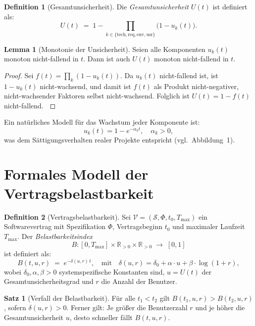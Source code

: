 ﻿\documentclass[a4paper,12pt]{article}
\theoremstyle{definition}
\newtheorem{definition}{Definition}
\newtheorem{satz}{Satz}
\newtheorem{lemma}{Lemma}
\newenvironment{beweis}{\begin{proof}}{\end{proof}}
\begin{document}
\begin{definition}[Gesamtunsicherheit]
    Die \emph{Gesamtunsicherheit} $U(t)$ ist definiert als:
    \[
        U(t) \;=\; 1 - \prod_{k \in \{\mathrm{tech, req, env, usr}\}} \bigl(1 - u_k(t)\bigr).
    \]
\end{definition}

\begin{lemma}[Monotonie der Unsicherheit]
\label{lem:monotonie}
    Seien alle Komponenten $u_k(t)$ monoton nicht-fallend in $t$. Dann ist auch $U(t)$
    monoton nicht-fallend in $t$.
\end{lemma}

\begin{beweis}
    Sei $f(t) = \prod_{k}(1 - u_k(t))$. Da $u_k(t)$ nicht-fallend ist, ist $1 - u_k(t)$
    nicht-wachsend, und damit ist $f(t)$ als Produkt nicht-negativer, nicht-wachsender
    Faktoren selbst nicht-wachsend. Folglich ist $U(t) = 1 - f(t)$ nicht-fallend.
    $\qedhere$
\end{beweis}

Ein nat\"urliches Modell f\"ur das Wachstum jeder Komponente ist:
\[
    u_k(t) = 1 - e^{-\alpha_k t}, \quad \alpha_k > 0,
\]
was dem S\"attigungsverhalten realer Projekte entspricht (vgl.\ Abbildung~1).

\section{Formales Modell der Vertragsbelastbarkeit}

\begin{definition}[Vertragsbelastbarkeit]
\label{def:belastbarkeit}
    Sei $\mathcal{V} = (\mathcal{S}, \Phi, t_0, T_{\max})$ ein Softwarevertrag mit
    Spezifikation $\Phi$, Vertragsbeginn $t_0$ und maximaler Laufzeit $T_{\max}$.
    Der \emph{Belastbarkeitsindex}
    \[
        B\colon [0, T_{\max}] \times \mathbb{R}_{>0} \times \mathbb{R}_{>0} \;\to\; [0,1]
    \]
    ist definiert als:
    \[
        B(t, u, r) \;=\; e^{-\delta(u, r)\, t},
        \quad \text{mit} \quad
        \delta(u, r) = \delta_0 + \alpha \cdot u + \beta \cdot \log(1 + r),
    \]
    wobei $\delta_0, \alpha, \beta > 0$ systemspezifische Konstanten sind,
    $u = U(t)$ der Gesamtunsicherheitsgrad und $r$ die Anzahl der Benutzer.
\end{definition}

\begin{satz}[Verfall der Belastbarkeit]
\label{satz:verfall}
    F\"ur alle $t_1 < t_2$ gilt $B(t_1, u, r) > B(t_2, u, r)$, sofern $\delta(u,r) > 0$.
    Ferner gilt: Je gr\"o\ss{}er die Benutzerzahl $r$ und je h\"oher die Gesamtunsicherheit
    $u$, desto schneller f\"allt $B(t, u, r)$.
\end{satz}
\end{document}
